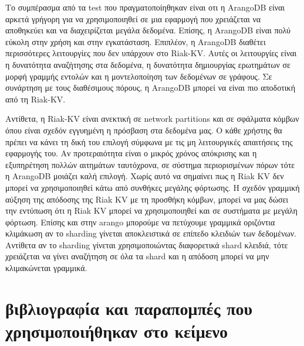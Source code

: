 \documentclass[conference]{IEEEtran}
\begin{document}


Το συμπέρασμα από τα test που πραγματοποίηθηκαν είναι οτι η ArangoDB είναι
αρκετά γρήγορη για να χρησιμοποιηθεί σε μια εφαρμογή που χρειάζεται να αποθηκεύει
και να διαχειρίζεται μεγάλα δεδομένα. Επίσης, η ArangoDB είναι πολύ εύκολη στην
χρήση και στην εγκατάσταση. Επιπλέον, η ArangoDB διαθέτει περισσότερες λειτουργίες
που δεν υπάρχουν στο Riak-KV.
Αυτές οι λειτουργίες είναι η δυνατότητα
αναζήτησης στα δεδομένα, η δυνατότητα δημιουργίας ερωτημάτων σε μορφή
γραμμής εντολών και η μοντελοποίηση των δεδομένων σε γράφους. 
Σε συνάρτηση με τους διαθέσιμους πόρους, η ArangoDB μπορεί να
είναι πιο αποδοτική από τη  Riak-KV. 

Αντίθετα, η Riak-KV είναι ανεκτική σε 
network partitions και σε σφάλματα κόμβων όπου είναι σχεδόν εγγυημένη η πρόσβαση
στα δεδομένα μας. Ο κάθε χρήστης θα πρέπει να κάνει τη δική του επιλογή 
σύμφωνα με τις μη λειτουργικές απαιτήσεις της εφαρμογής του. Αν προτεραιότητα είναι ο μικρός 
χρόνος απόκρισης και η εξυπηρέτηση πολλών αιτημάτων ταυτόχρονα, σε σύστημα περιορισμένων πόρων
τότε η ArangoDB μοιάζει καλή επιλογή. Χωρίς αυτό να σημαίνει πως η Riak KV δεν μπορεί να χρησιμοποιηθεί
κάτω από συνθήκες μεγάλης φόρτωσης. Η σχεδόν γραμμική αύξηση της απόδοσης της Riak KV
με τη προσθήκη κόμβων, μπορεί να μας δώσει την εντύπωση ότι η Riak KV μπορεί να χρησιμοποιηθεί και σε
συστήματα με μεγάλη φόρτωση. 
Επίσης και στην arango μπορούμε να πετύχουμε γραμμικά οριζόντια κλιμάκωση αν το 
sharding γίνεται αποκλειστικά σε επίπεδο κλειδιών των δεδομένων. Αντίθετα αν το sharding γίνεται χρησιμοποιώντας 
διαφορετικά shard κλειδιά, τότε χρειάζεται να γίνει αναζήτηση σε όλα τα shard και η απόδοση 
μπορεί να μην κλιμακώνεται γραμμικά.
\section{βιβλιογραφία και παραπομπές που χρησιμοποιήθηκαν στο κείμενο}
\end{document}
